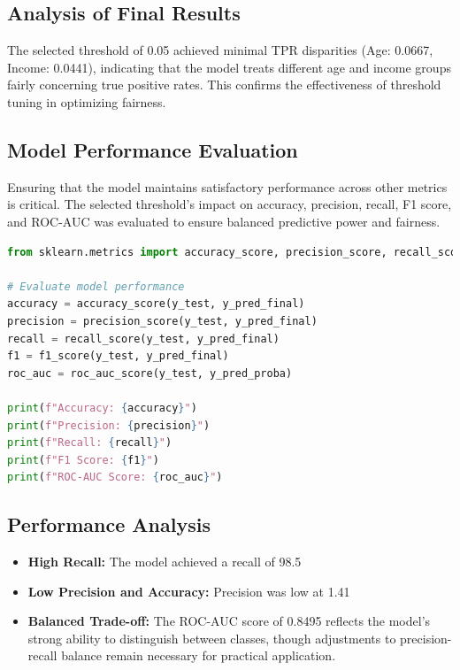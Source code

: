 \documentclass[12pt,a4paper]{report}
\begin{document}
\subsection{Analysis of Final Results}

The selected threshold of 0.05 achieved minimal TPR disparities (Age: 0.0667, Income: 0.0441), indicating that the model treats different age and income groups fairly concerning true positive rates. This confirms the effectiveness of threshold tuning in optimizing fairness.\\

\subsection{Model Performance Evaluation}

Ensuring that the model maintains satisfactory performance across other metrics is critical. The selected threshold's impact on accuracy, precision, recall, F1 score, and ROC-AUC was evaluated to ensure balanced predictive power and fairness.\\

\begin{lstlisting}[language=Python, caption={Evaluate Model Performance}]
from sklearn.metrics import accuracy_score, precision_score, recall_score, f1_score, roc_auc_score

# Evaluate model performance
accuracy = accuracy_score(y_test, y_pred_final)
precision = precision_score(y_test, y_pred_final)
recall = recall_score(y_test, y_pred_final)
f1 = f1_score(y_test, y_pred_final)
roc_auc = roc_auc_score(y_test, y_pred_proba)

print(f"Accuracy: {accuracy}")
print(f"Precision: {precision}")
print(f"Recall: {recall}")
print(f"F1 Score: {f1}")
print(f"ROC-AUC Score: {roc_auc}")
\end{lstlisting}

\subsection{Performance Analysis}

\begin{itemize}
    \item \textbf{High Recall:} The model achieved a recall of 98.5%
    \item \textbf{Low Precision and Accuracy:} Precision was low at 1.41%
    \item \textbf{Balanced Trade-off:} The ROC-AUC score of 0.8495 reflects the model's strong ability to distinguish between classes, though adjustments to precision-recall balance remain necessary for practical application.
\end{itemize}
\end{document}
